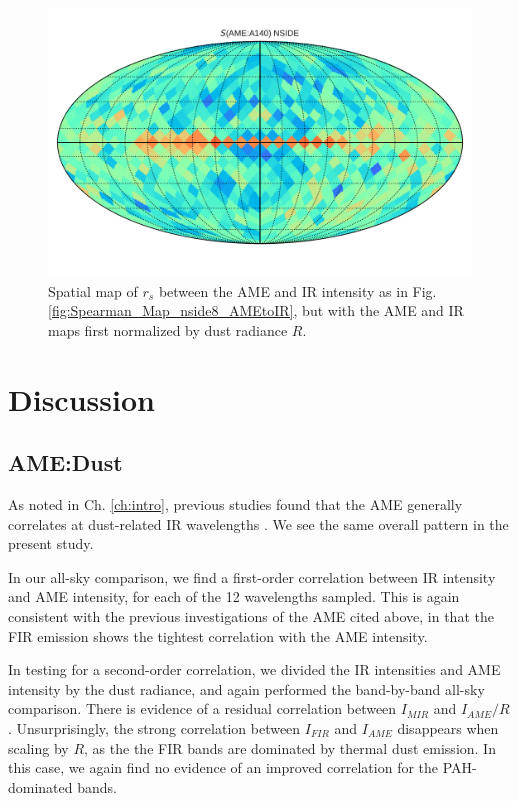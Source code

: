{\begin{figure}
      \includegraphics[width=\textwidth/3]{../Plots/Allsky_Corr/RadNorm/Spearman_Map_nside8_AMEtoA140.pdf}
      \centering
      \caption{Spatial map of $r_{s}$ between the AME and IR intensity as in Fig. \ref{fig:Spearman_Map_nside8_AMEtoIR}, but with the AME and IR maps first normalized by dust radiance $R$.}
      \label{fig:Spearman_Map_nside8_AMEtoIR_radnorm}
    \end{figure}


    \section{Discussion}
      \subsection{AME:Dust}
        As noted in Ch. \hyperref[ch:intro]{\ref*{ch:intro}}, previous studies found that the AME generally correlates at dust-related IR wavelengths \citep{ysard10b,planckXV, hensley16}. We see the same overall pattern in the present study.

         In our all-sky comparison, we find a first-order correlation between IR intensity and AME intensity, for each of the 12 wavelengths sampled. This is again consistent with the previous investigations of the AME cited above, in that the FIR emission shows the tightest correlation with the AME intensity.

         In testing for a second-order correlation, we divided the IR intensities and AME intensity by the dust radiance, and again performed the band-by-band all-sky comparison. There is evidence of a residual correlation between $I_{MIR}$ and $I_{AME}/R$. Unsurprisingly, the strong correlation between $I_{FIR}$ and $I_{AME}$ disappears when scaling by $R$, as the the FIR bands are dominated by thermal dust emission. In this case, we again find no evidence of an improved correlation for the PAH-dominated bands.

}
